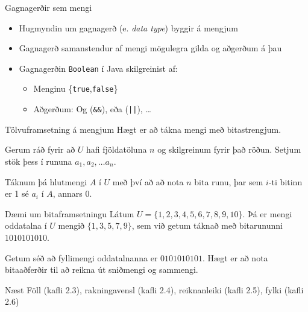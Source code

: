 \documentclass{beamer}
\begin{document}
\begin{frame}[fragile]{Gagnagerðir sem mengi}
 \begin{itemize}
  \item Hugmyndin um gagnagerð (e. \emph{data type}) byggir á mengjum
  \item Gagnagerð samanstendur af mengi mögulegra gilda og aðgerðum á þau
  \item Gagnagerðin \texttt{Boolean} í Java skilgreinist af:
  \begin{itemize}
   \item Menginu \{\texttt{true},\texttt{false}\}
   \item Aðgerðum: Og (\verb|&&|), eða (\verb&||&), \ldots
  \end{itemize}
 \end{itemize}
\end{frame}

\begin{frame}[fragile]{Tölvuframsetning á mengjum}
Hægt er að tákna mengi með bitastrengjum.

Gerum ráð fyrir að $U$ hafi fjöldatöluna $n$ og skilgreinum fyrir það röðun. Setjum stök þess í rununa $a_1, a_2, \ldots a_n$.

Táknum þá hlutmengi $A$ í $U$ með því að að nota $n$ bita runu, þar sem $i$-ti bitinn er 1 sé $a_i$ í $A$, annars 0.
\end{frame}

\begin{frame}[fragile]{Dæmi um bitaframsetningu}
Látum $U = \{1, 2, 3, 4, 5, 6, 7, 8, 9, 10\}$. Þá er mengi oddatalna í $U$ mengið $\{1, 3, 5, 7, 9\}$, sem við getum táknað með bitarununni $1010101010$. 

Getum séð að fyllimengi oddatalnanna er $0101010101$. Hægt er að nota bitaaðferðir til að reikna út sniðmengi og sammengi.
\end{frame}

\begin{frame}{Næst}
Föll (kafli 2.3), rakningavensl (kafli 2.4), reiknanleiki (kafli 2.5), fylki (kafli 2.6)
\end{frame}
\end{document}
